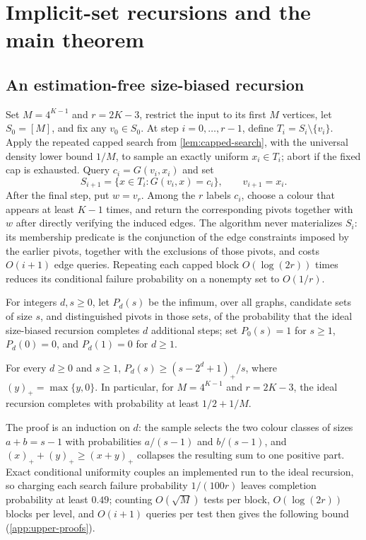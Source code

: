 \section{Implicit-set recursions and the main theorem}\label{sec:algorithm}

\subsection{An estimation-free size-biased recursion}

Set $M=4^{K-1}$ and $r=2K-3$, restrict the input to its first $M$ vertices,
let $S_0=[M]$, and fix any $v_0\in S_0$.  At step
$i=0,\ldots,r-1$, define $T_i=S_i\setminus\{v_i\}$.  Apply the repeated
capped search from \cref{lem:capped-search}, with the universal density lower
bound $1/M$, to sample an exactly uniform $x_i\in T_i$; abort if the fixed
cap is exhausted.  Query $c_i=G(v_i,x_i)$ and set
\[
 S_{i+1}=\{x\in T_i:G(v_i,x)=c_i\},
 \qquad v_{i+1}=x_i.
\]
After the final step, put $w=v_r$.  Among the $r$ labels $c_i$, choose a
colour that appears at least $K-1$ times, and return the corresponding
pivots together with $w$ after directly verifying the induced edges.  The
algorithm never materializes $S_i$: its membership predicate is the
conjunction of the edge constraints imposed by the earlier pivots, together
with the exclusions of those pivots, and costs $O(i+1)$ edge queries.
Repeating each capped block $O(\log(2r))$ times reduces its conditional
failure probability on a nonempty set to $O(1/r)$.

For integers $d,s\ge0$, let $P_d(s)$ be the infimum, over all graphs,
candidate sets of size $s$, and distinguished pivots in those sets, of the
probability that the ideal size-biased recursion completes $d$ additional
steps; set $P_0(s)=1$ for $s\ge1$, $P_d(0)=0$, and $P_d(1)=0$ for $d\ge1$.

\begin{lemma}\label{lem:size-biased-survival}
For every $d\ge0$ and $s\ge1$,
$P_d(s)\ge(s-2^d+1)_+/s$, where $(y)_+=\max\{y,0\}$.
In particular, for $M=4^{K-1}$ and $r=2K-3$, the ideal recursion completes
with probability at least $1/2+1/M$.
\end{lemma}

The proof is an induction on $d$: the sample selects the two colour classes
of sizes $a+b=s-1$ with probabilities $a/(s-1)$ and $b/(s-1)$, and
$(x)_++(y)_+\ge(x+y)_+$ collapses the resulting sum to one positive part.
Exact conditional uniformity couples an implemented run to the ideal
recursion, so charging each search failure probability $1/(100r)$ leaves
completion probability at least $0.49$; counting $O(\sqrt M)$ tests per
block, $O(\log(2r))$ blocks per level, and $O(i+1)$ queries per test then
gives the following bound (\cref{app:upper-proofs}).

